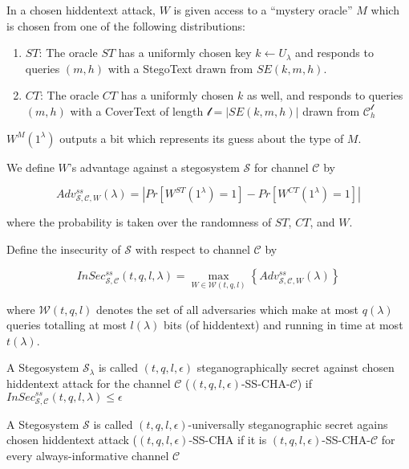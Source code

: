 \begin{definition}
In a chosen hiddentext attack, $W$ is given access to a ``mystery oracle'' $M$ which is chosen from one of the following distributions:

\begin{enumerate}
\item $ST$: The oracle $ST$ has a uniformly chosen key $k \leftarrow U_\lambda$ and responds to queries $(m, h)$ with a StegoText drawn from $SE(k, m, h)$.
\item $CT$: The oracle $CT$ has a uniformly chosen $k$ as well, and responds to queries $(m, h)$ with a CoverText of length $\mathcal{l} = |SE(k, m, h)|$ drawn from $\mathcal{C}_h^{\mathcal{l}}$
\end{enumerate}

$W^M(1^\lambda)$ outputs a bit which represents its guess about the type of $M$.

We define $W$'s advantage against a stegosystem $\mathcal{S}$ for channel $\mathcal{C}$ by

$$Adv_{\mathcal{S}, \mathcal{C}, W}^{ss}(\lambda) = |Pr[W^{ST}(1^\lambda)=1] - Pr[W^{CT}(1^\lambda)=1]|$$

where the probability is taken over the randomness of $ST$, $CT$, and $W$. 

Define the insecurity of $\mathcal{S}$ with respect to channel $\mathcal{C}$ by

$$InSec_{\mathcal{S}, \mathcal{C}}^{ss}(t, q, l, \lambda) = \max_{W \in \mathcal{W}(t, q, l)} \left\{ Adv_{\mathcal{S}, \mathcal{C}, W}^{ss}(\lambda) \right\}$$

where $\mathcal{W}(t, q, l)$ denotes the set of all adversaries which make at most $q(\lambda)$ queries totalling at most $l(\lambda)$ bits (of hiddentext) and running in time at most $t(\lambda)$.
\end{definition}

\begin{definition}
\label{def:sec-hopper}
A Stegosystem $\mathcal{S}_\lambda$ is called $(t,q,l,\epsilon)$ steganographically secret against chosen hiddentext attack for the channel $\mathcal{C}$ ($(t,q,l,\epsilon)$-SS-CHA-$\mathcal{C}$) if $InSec_{\mathcal{S},\mathcal{C}}^{ss}(t,q,l,\lambda) \leq \epsilon$
\end{definition}

\begin{definition}
A Stegosystem $\mathcal{S}$ is called $(t, q, l, \epsilon)$-universally steganographic secret agains chosen hiddentext attack ($(t,q,l,\epsilon)$-SS-CHA if it is $(t,q,l,\epsilon)$-SS-CHA-$\mathcal{C}$ for every always-informative channel $\mathcal{C}$
\end{definition}


